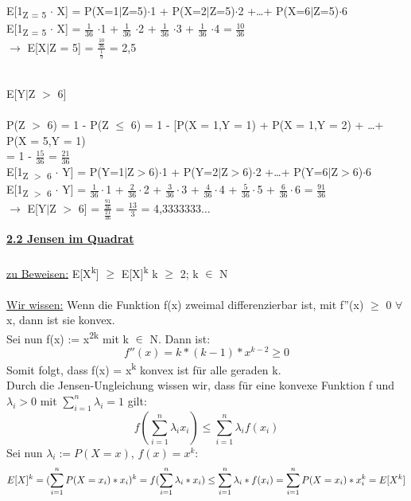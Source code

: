 \documentclass{article}
\begin{document}
\begin{compactenum}[a)]
	E[1\textsubscript{Z = 5} $\cdot$ X] = P(X=1$\mid$Z=5)$\cdot$1 + P(X=2$\mid$Z=5)$\cdot$2 +\ldots + P(X=6$\mid$Z=5)$\cdot$6 \\
	E[1\textsubscript{Z = 5} $\cdot$ X] = $\frac{1}{36}$ $\cdot$1 + $\frac{1}{36}$ $\cdot$2 + $\frac{1}{36}$ $\cdot$3 + $\frac{1}{36}$ $\cdot$4 = $\frac{10}{36}$ \\
	$\rightarrow$  E[X$\mid$Z = 5] = $\frac{\frac{10}{36}}{\frac{1}{9}}$ = 2,5 \\
	\\
	\item E[Y$\mid$Z $>$ 6] \\
	\\
	P(Z $>$ 6) = 1 - P(Z $\leq$ 6) = 1 - [P(X = 1,Y = 1) +  P(X = 1,Y = 2) + \ldots + P(X = 5,Y = 1) \\
	= 1 - $\frac{15}{36}$ = $\frac{21}{36}$ \\
	E[1\textsubscript{Z $>$ 6} $\cdot$ Y] = P(Y=1$\mid$Z$>$6)$\cdot$1 + P(Y=2$\mid$Z$>$6)$\cdot$2 +\ldots + P(Y=6$\mid$Z$>$6)$\cdot$6 \\
	E[1\textsubscript{Z $>$ 6} $\cdot$ Y] = $\frac{1}{36}\cdot$1 + $\frac{2}{36}\cdot$2 + $\frac{3}{36}\cdot$3 + $\frac{4}{36}\cdot$4 + $\frac{5}{36}\cdot$5 + $\frac{6}{36}\cdot$6 = $\frac{91}{36}$\\
	$\rightarrow$  E[Y$\mid$Z $>$ 6] = $\frac{\frac{91}{36}}{\frac{21}{36}}$ = $\frac{13}{3}$ = 4,3333333... \\
\end{compactenum}

\newpage

\textbf{\underline{2.2 Jensen im Quadrat}} \\
\\
\underline{zu Beweisen:} E[X\textsuperscript{k}] $\geq$ E[X]\textsuperscript{k} \hspace{1cm} k $\geq$ 2; k $\in$ N \\
\\
\underline{Wir wissen:} Wenn die Funktion f(x) zweimal differenzierbar ist, mit f''(x) $\geq$ 0 $\forall$ x, dann ist sie konvex. \\
Sei nun f(x) := x\textsuperscript{2k} mit k $\in$ N. Dann ist: \\
\[
	f''(x) = k * (k-1) * x^{k-2} \geq 0
\]
Somit folgt, dass f(x) = x\textsuperscript{k} konvex ist für alle geraden k. \\
Durch die Jensen-Ungleichung wissen wir, dass für eine konvexe Funktion f und $\lambda_i > 0$ mit $\sum_{i=1}^n \lambda_i = 1$ gilt: \\
\[
	f(\sum_{i=1}^n{\lambda_i x_i}) \leq \sum_{i=1}^n{\lambda_i f(x_i)}
\]
Sei nun $\lambda_i := P(X = x)$, $f(x) = x^k$:
\[
	E[X]^k = (\sum_{i=1}^n{P(X=x_i) * x_i})^k \\
	= f(\sum_{i=1}^n{\lambda_i * x_i}) \\
	\leq \sum_{i=1}^n{\lambda_i * f(x_i)} \\
	= \sum_{i=1}^n{P(X=x_i) * x_i^k} \\
	= E[X^k]
\]
\\
\\
\end{document}
